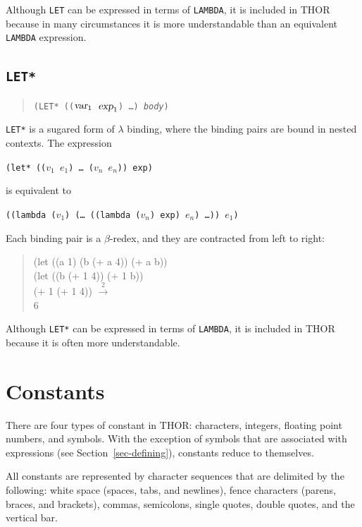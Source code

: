 	Although {\tt LET} can be expressed in terms of {\tt LAMBDA}, it is
included in THOR because in many circumstances it is more
understandable than an equivalent {\tt LAMBDA} expression.


\subsection{\tt LET*}

\begin{quote}
	{\tt (LET* ((${\mbox{\sl var}}_1$ ${\mbox{\sl exp}}_1$) \ldots) 
				{\sl body})}
\end{quote}

	{\tt LET*} is a sugared form of $\lambda$ binding, where
the binding pairs are bound in nested contexts.
The expression 
\begin{center}
{\mbox{\tt (let* (($v_1$ $e_1$) \ldots\ ($v_n$ $e_n$)) exp)}} 
\end{center}
is equivalent to 
\begin{center}
{\mbox{\tt ((lambda ($v_1$) (\ldots\ ((lambda ($v_n$) exp) $e_n$) 
										\ldots)) $e_1$)}}
\end{center}
Each binding pair is a $\beta$-redex, and they are contracted from left
to right:
\begin{quote}
\begin{tt}
	(let ((a 1) (b (+ a 4)) (+ a b)) \reds \\
	(let ((b (+ 1 4)) (+ 1 b)) \reds \\
	(+ 1 (+ 1 4)) $\stackrel{2}{\longrightarrow}$\\
	6
\end{tt}
\end{quote}

	 Although {\tt LET*} can be expressed in 
terms of {\tt LAMBDA}, it is
included in THOR because it is often more understandable.



\section{Constants}

	There are four types of constant in THOR: characters, 
integers, floating point
numbers, and symbols.  With the exception of symbols that
are associated with expressions (see Section~\ref{sec-defining}),
constants reduce to themselves.

	All constants are represented by character sequences that are
delimited by the following: white space (spaces, tabs,
and newlines), fence characters (parens, braces, and brackets), commas,
semicolons, single quotes, double quotes, and the vertical bar.


